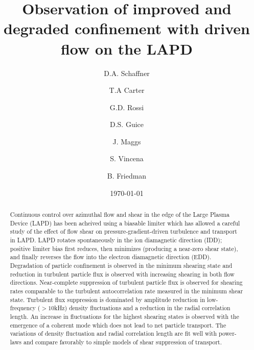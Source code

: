 \documentclass[aps,prl,amsmath,amssymb,preprint,superscriptaddress]{revtex4}
\begin{document}
\title{Observation of improved and degraded confinement with driven flow on the LAPD}
\author{D.A. Schaffner}
\author{T.A Carter}
\author{G.D. Rossi}
\author{D.S. Guice}
\author{J. Maggs}
\author{S. Vincena}
\author{B. Friedman}


\date{\today}

\begin{abstract}
Continuous control over azimuthal flow and shear in the edge of the Large Plasma Device (LAPD) has been acheived using a biasable limiter which has allowed a careful study of the effect of flow shear on pressure-gradient-driven turbulence and transport in LAPD. LAPD rotates spontaneously in the ion diamagnetic direction (IDD); positive limiter bias first reduces, then minimizes (producing a near-zero shear state), and finally reverses the flow into the electron diamagnetic direction (EDD). Degradation of particle confinement is observed in the minimum shearing state and reduction in turbulent particle flux is observed with increasing shearing in both flow directions. Near-complete suppression of turbulent particle flux is observed for shearing rates comparable to the turbulent autocorrelation rate measured in the minimum shear state.  Turbulent flux suppression is dominated by amplitude reduction in low-frequency ($>10$kHz) density fluctuations and a reduction in the radial correlation length. An increase in fluctuations for the highest shearing states is observed with the emergence of a coherent mode which does not lead to net particle transport. The variations of density fluctuation and radial correlation length are fit well with power-laws and compare favorably to simple models of shear suppression of transport.
\end{abstract}

\maketitle
\end{document}
